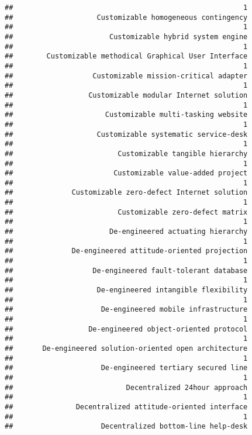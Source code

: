 \documentclass[
]{article}
\begin{document}
\begin{verbatim}
##                                                       1 
##                    Customizable homogeneous contingency 
##                                                       1 
##                       Customizable hybrid system engine 
##                                                       1 
##        Customizable methodical Graphical User Interface 
##                                                       1 
##                   Customizable mission-critical adapter 
##                                                       1 
##                  Customizable modular Internet solution 
##                                                       1 
##                      Customizable multi-tasking website 
##                                                       1 
##                    Customizable systematic service-desk 
##                                                       1 
##                         Customizable tangible hierarchy 
##                                                       1 
##                        Customizable value-added project 
##                                                       1 
##              Customizable zero-defect Internet solution 
##                                                       1 
##                         Customizable zero-defect matrix 
##                                                       1 
##                       De-engineered actuating hierarchy 
##                                                       1 
##              De-engineered attitude-oriented projection 
##                                                       1 
##                   De-engineered fault-tolerant database 
##                                                       1 
##                    De-engineered intangible flexibility 
##                                                       1 
##                     De-engineered mobile infrastructure 
##                                                       1 
##                  De-engineered object-oriented protocol 
##                                                       1 
##       De-engineered solution-oriented open architecture 
##                                                       1 
##                     De-engineered tertiary secured line 
##                                                       1 
##                           Decentralized 24hour approach 
##                                                       1 
##               Decentralized attitude-oriented interface 
##                                                       1 
##                     Decentralized bottom-line help-desk 

\end{verbatim}
\end{document}
